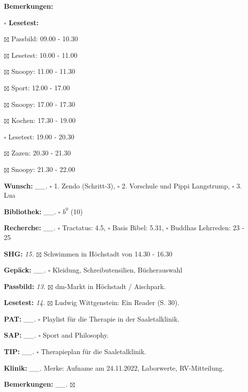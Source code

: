 \documentclass[10pt,a4paper]{article}
\newcommand\prop[1] {{\color {alizarin} {\bf #1}}}             %
\newcommand\opti[1] {{\color {amethyst} {\bf #1}}}             %
\newcommand\mand[1] {{\color {burntorange} {\bf #1}}}          %
\newcommand\bottomspace{\vskip 4pt}
\newcommand\n[1] { {\sl #1.} \hskip 5pt }
\begin{document}
\begin{mdframed}[style=daystyle]
\begin{labeling}{{\mand {Bemerkungen:}}}
\begin{minipage}{0.75\textwidth}
\begin{labeling}{\prop {$\square$ {Lesetest:}}}
      \item[$\boxtimes$ Passbild:] 09.00 - 10.30
      \item[$\boxtimes$ Lesetest:] 10.00 - 11.00
        
      \item[$\boxtimes$ Snoopy:]   11.00 - 11.30
      \item[$\boxtimes$ Sport:]    12.00 - 17.00        
        
      \item[$\boxtimes$ Snoopy:]   17.00 - 17.30
      \item[$\boxtimes$ Kochen:]   17.30 - 19.00
      \item[$\square$ Lesetest:] 19.00 - 20.30
        
      \item[$\boxtimes$ Zazen:]    20.30 - 21.30
      \item[$\boxtimes$ Snoopy:]   21.30 - 22.00
      \end{labeling}
    \end{minipage}
    \bottomspace
  \item[{\mand {Wunsch:}}]       \n{\_\_} $\square$ 1. Zendo (Schritt-3),
      $\square$ 2. Vorschule und Pippi Langstrump, $\square$ 3. Lua
  \item[{\mand {Bibliothek:}}]   \n{\_\_} $\square$ $b^{0}$ (10)
  \item[{\mand {Recherche:}}]    \n{\_\_} $\square$ Tractatus: 4.5, $\square$ Basis Bibel: 5.31,
      $\square$ Buddhas Lehrreden: 23 - 25
  \item[{\mand {SHG:}}]            \n{15} $\boxtimes$ Schwimmen in Höchstadt von 14.30 - 16.30
  \item[{\mand {Gepäck:}}]       \n{\_\_} $\square$ Kleidung, Schreibutensilien, Bücherauswahl
  \item[{\opti {Passbild:}}]       \n{13} $\boxtimes$ dm-Markt in Höchstadt / Aischpark.
  \item[{\opti {Lesetest:}}]       \n{14} $\boxtimes$ Ludwig Wittgenstein: Ein Reader (S. 30).
  \item[{\opti {PAT:}}]          \n{\_\_} $\square$ Playlist für die Therapie in der Saaletalklinik.
  \item[{\opti {SAP:}}]          \n{\_\_} $\square$ Sport and Philosophy.
  \item[{\opti {TIP:}}]          \n{\_\_} $\square$ Therapieplan für die Saaletalklinik.
  \item[{\opti {Klinik:}}]       \n{\_\_} Merke: Aufname am 24.11.2022, Laborwerte, RV-Mitteilung.
  \item[{\mand {Bemerkungen:}}]  \n{\_\_} $\boxtimes$
  \end{labeling}
    

\end{mdframed}
\end{document}
